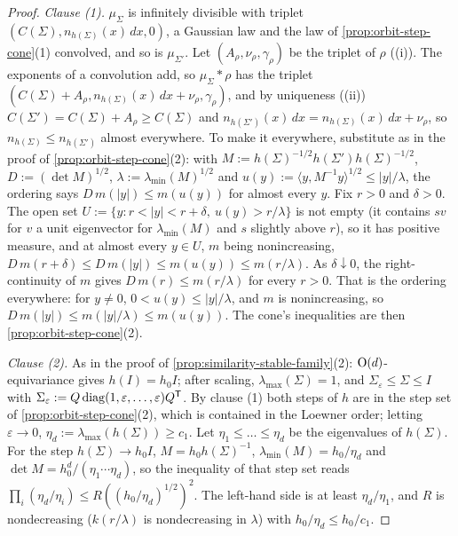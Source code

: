 \begin{proof}
\leanok
\emph{Clause (1).} $\mu_\Sigma$ is infinitely divisible with triplet
$(C(\Sigma), n_{h(\Sigma)}(x)\,dx, 0)$, a Gaussian law and the law of \ref{prop:orbit-step-cone}(1)
convolved, and so is $\mu_{\Sigma'}$. Let $(A_\rho, \nu_\rho, \gamma_\rho)$ be the triplet of $\rho$
((i)). The exponents of a convolution add, so $\mu_\Sigma * \rho$ has the triplet
$(C(\Sigma) + A_\rho, n_{h(\Sigma)}(x)\,dx + \nu_\rho, \gamma_\rho)$, and by uniqueness
((ii)) $C(\Sigma') = C(\Sigma) + A_\rho \ge C(\Sigma)$ and $n_{h(\Sigma')}(x)\,dx =
n_{h(\Sigma)}(x)\,dx + \nu_\rho$, so $n_{h(\Sigma)} \le n_{h(\Sigma')}$ almost everywhere. To make it
everywhere, substitute as in the proof of \ref{prop:orbit-step-cone}(2): with
$M := h(\Sigma)^{-1/2}h(\Sigma')h(\Sigma)^{-1/2}$, $D := (\det M)^{1/2}$,
$\lambda := \lambda_{\min}(M)^{1/2}$ and $u(y) := \langle y,M^{-1}y\rangle^{1/2} \le |y|/\lambda$, the ordering
says $D\,m(|y|) \le m(u(y))$ for almost every $y$. Fix $r > 0$ and $\delta > 0$. The open set
$U := \{y : r < |y| < r + \delta,\ u(y) > r/\lambda\}$ is not empty (it contains $sv$ for $v$ a unit
eigenvector for $\lambda_{\min}(M)$ and $s$ slightly above $r$), so it has positive measure, and at almost
every $y \in U$, $m$ being nonincreasing,
$D\,m(r + \delta) \le D\,m(|y|) \le m(u(y)) \le m(r/\lambda)$. As $\delta \downarrow 0$, the
right-continuity of $m$ gives $D\,m(r) \le m(r/\lambda)$ for every $r > 0$.
That is the ordering everywhere: for $y \ne 0$, $0 < u(y) \le |y|/\lambda$, and $m$ is
nonincreasing, so $D\,m(|y|) \le m(|y|/\lambda) \le m(u(y))$. The cone's inequalities are then
\ref{prop:orbit-step-cone}(2).

\emph{Clause (2).} As in the proof of \ref{prop:similarity-stable-family}(2): $\mathrm{O}(d)$-equivariance
gives $h(I) = h_0I$; after scaling, $\lambda_{\max}(\Sigma) = 1$, and $\Sigma_\varepsilon \le \Sigma \le I$
with $\Sigma_\varepsilon := Q\operatorname{diag}(1,\varepsilon,\dots,\varepsilon)Q^{\mathsf{T}}$. By clause (1) both steps of
$h$ are in the step set of \ref{prop:orbit-step-cone}(2), which is contained in the Loewner order; letting
$\varepsilon \to 0$, $\eta_d := \lambda_{\max}(h(\Sigma)) \ge c_1$. Let $\eta_1 \le \dots \le \eta_d$ be the
eigenvalues of $h(\Sigma)$. For the step $h(\Sigma) \to h_0I$, $M = h_0h(\Sigma)^{-1}$,
$\lambda_{\min}(M) = h_0/\eta_d$ and $\det M = h_0^d/(\eta_1\cdots\eta_d)$, so the inequality of that step set reads
$\prod_i(\eta_d/\eta_i) \le R((h_0/\eta_d)^{1/2})^2$. The left-hand side is at least $\eta_d/\eta_1$,
and $R$ is nondecreasing ($k(r/\lambda)$ is nondecreasing in $\lambda$) with $h_0/\eta_d \le h_0/c_1$.


\end{proof}
